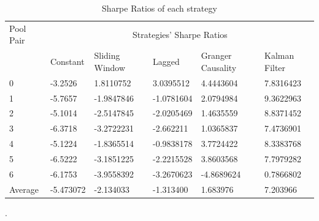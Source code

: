 \begin{table}[!htb]
    \centering
    \begin{adjustwidth}{-0.8in}{-0.9in}
        \begin{tabular}{|p{5em}|p{7em}|p{7em}|p{7em}|p{8em}|p{7em}|}\hline
            Pool Pair & \multicolumn{5}{|c|}{Strategies' Sharpe Ratios} \\\cline{1-6}
            & Constant & Sliding Window & Lagged & Granger Causality & Kalman Filter\\\cline{2-6}
            0 & -3.2526 & 1.8110752 & 3.0395512 & 4.4443604 & 7.8316423\\\cline{2-6}
            1 & -5.7657 & -1.9847846 & -1.0781604 & 2.0794984 & 9.3622963\\\cline{2-6}
            2 & -5.1014 & -2.5147845 & -2.0205469 & 1.4635559 & 8.8371452\\\cline{2-6}
            3 & -6.3718 & -3.2722231 & -2.662211 & 1.0365837 & 7.4736901\\\cline{2-6}
            4 & -5.1224 & -1.8365514 & -0.9838178 & 3.7724422 & 8.3383768\\\cline{2-6}
            5 & -6.5222 & -3.1851225 & -2.2215528 & 3.8603568 & 7.7979282\\\cline{2-6}
            6 & -6.1753 & -3.9558392 & -3.2670623 & -4.8689624 & 0.7866802\\\hline\hline
            Average & -5.473072 & -2.134033 & -1.313400 & 1.683976 & 7.203966 \\\hline
        \end{tabular}
    \end{adjustwidth}
    \caption{Sharpe Ratios of each strategy \label{tab:sharpes}}.
\end{table}

